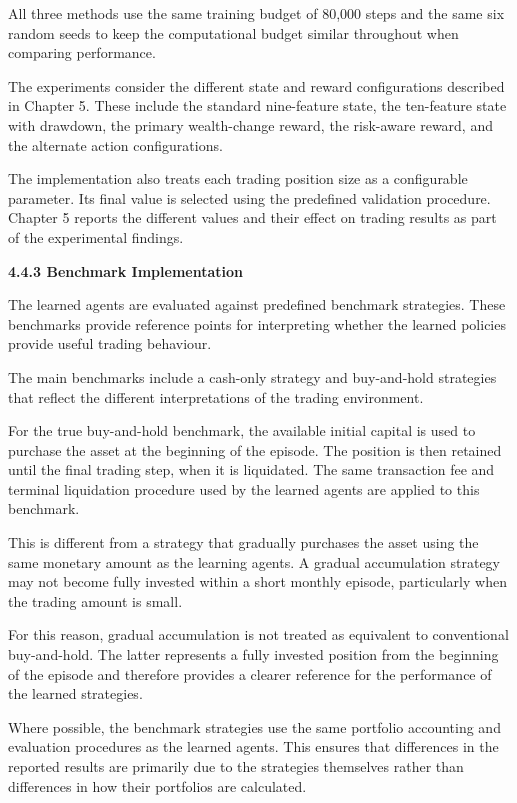 All three methods use the same training budget of 80,000 steps and the
same six random seeds to keep the computational budget similar
throughout when comparing performance.

The experiments consider the different state and reward configurations
described in Chapter 5. These include the standard nine-feature state,
the ten-feature state with drawdown, the primary wealth-change reward,
the risk-aware reward, and the alternate action configurations.

The implementation also treats each trading position size as a
configurable parameter. Its final value is selected using the predefined
validation procedure. Chapter 5 reports the different values and their
effect on trading results as part of the experimental findings.

\textbf{4.4.3 Benchmark Implementation}

The learned agents are evaluated against predefined benchmark
strategies. These benchmarks provide reference points for interpreting
whether the learned policies provide useful trading behaviour.

The main benchmarks include a cash-only strategy and buy-and-hold
strategies that reflect the different interpretations of the trading
environment.

For the true buy-and-hold benchmark, the available initial capital is
used to purchase the asset at the beginning of the episode. The position
is then retained until the final trading step, when it is liquidated.
The same transaction fee and terminal liquidation procedure used by the
learned agents are applied to this benchmark.

This is different from a strategy that gradually purchases the asset
using the same monetary amount as the learning agents. A gradual
accumulation strategy may not become fully invested within a short
monthly episode, particularly when the trading amount is small.

For this reason, gradual accumulation is not treated as equivalent to
conventional buy-and-hold. The latter represents a fully invested
position from the beginning of the episode and therefore provides a
clearer reference for the performance of the learned strategies.

Where possible, the benchmark strategies use the same portfolio
accounting and evaluation procedures as the learned agents. This ensures
that differences in the reported results are primarily due to the
strategies themselves rather than differences in how their portfolios
are calculated.

